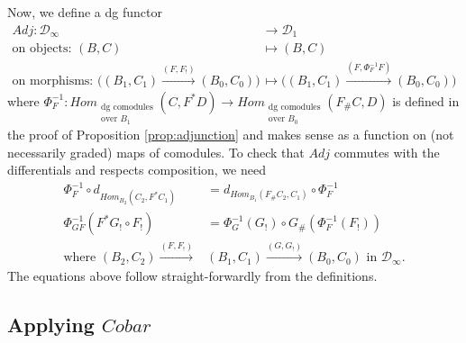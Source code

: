 Now, we define a dg functor 
\begin{align*}
Adj: \mathcal{D}_\infty 
&\to 
\mathcal{D}_1\\
\textrm{on objects: }(B,C)
& \mapsto
(B,C)\\
\textrm{on morphisms: }\bigg((B_1, C_1) 
  \xrightarrow{(F, F_!)} (B_0,C_0)\bigg)
& \mapsto
\bigg((B_1, C_1) 
  \xrightarrow{(F, \Phi^{-1}_FF)} 
  (B_0,C_0)\bigg)
\end{align*}
where 
$\Phi^{-1}_F:Hom_{\substack{
  \textrm{dg comodules}\\\textrm{over $B_1$}}}
  (C,F^*D) 
\to 
Hom_{\substack{
  \textrm{dg comodules}\\\textrm{over $B_0$}}}
  (F_\#C,D)$
is defined in the proof of Proposition 
\ref{prop:adjunction} and makes sense as 
a function on (not necessarily graded) 
maps of comodules. To check that $Adj$ 
commutes with the differentials and 
respects composition, we need
\begin{align*}
\Phi^{-1}_F \circ d_{Hom_{B_2}(C_2, F^*C_1)}
&= 
d_{Hom_{B_1}(F_\#C_2, C_1)} \circ \Phi^{-1}_F\\
\Phi^{-1}_{GF}(F^*G_! \circ F_!)
&=
\Phi^{-1}_G(G_!) \circ G_\#(\Phi^{-1}_F(F_!))\\
\textrm{where }
(B_2, C_2) 
  \xrightarrow{(F, F_!)} &(B_1,C_1)
  \xrightarrow{(G, G_!)} (B_0,C_0)
  \textrm{ in }\mathcal{D}_\infty.
\end{align*}
The equations above follow straight-forwardly 
from the definitions.
%
%
\subsection{Applying $Cobar$}





